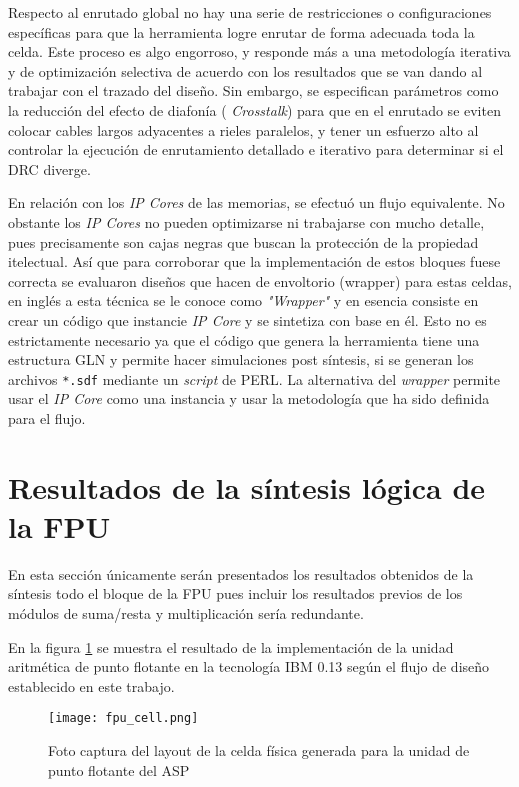 Respecto al enrutado global no hay una serie de restricciones o configuraciones específicas para que la herramienta logre enrutar de forma adecuada toda la celda. Este proceso es algo engorroso, y responde más a una metodología iterativa y de optimización selectiva de acuerdo con los resultados que se van dando al trabajar con el trazado del diseño. Sin embargo, se especifican parámetros como la reducción del efecto de diafonía ( \textit{Crosstalk}) para que en el enrutado se eviten colocar cables largos adyacentes a rieles paralelos, y tener un esfuerzo alto al controlar la ejecución de enrutamiento detallado e iterativo para determinar si el DRC diverge.

En relación con los \textit{IP Cores} de las memorias, se efectuó un flujo equivalente. No obstante los \textit{IP Cores} no pueden optimizarse ni trabajarse con mucho detalle, pues precisamente son cajas negras que buscan la protección de la propiedad itelectual. Así que para corroborar que la implementación de estos bloques fuese correcta se evaluaron diseños que hacen de envoltorio (wrapper) para estas celdas, en inglés a esta técnica se le conoce como \textit{"Wrapper"} y en esencia consiste en crear un código que instancie \textit{IP Core} y se sintetiza con base en él. Esto no es estrictamente necesario ya que el código que genera la herramienta tiene una estructura GLN y permite hacer simulaciones post síntesis, si se generan los archivos \texttt{*.sdf} mediante un \textit{script} de PERL. La alternativa del \textit{wrapper} permite usar el \textit{IP Core} como una instancia y usar la metodología que ha sido definida para el flujo.

\section{Resultados de la síntesis lógica de la FPU}
\label{sec:fpu_syn_result}
En esta sección únicamente serán presentados los resultados obtenidos de la síntesis todo el bloque de la FPU pues incluir los resultados previos de los módulos de suma/resta y multiplicación sería redundante.

En la figura \ref{fig:fpu_cell} se muestra el resultado de la implementación de la unidad aritmética de punto flotante en la tecnología IBM 0.13 según el flujo de diseño establecido en este trabajo.

\begin{figure}[h]
\texttt{[image: fpu\_cell.png]}
\centering
\caption{Foto captura del layout de la celda física generada para la unidad de punto flotante del ASP}
\label{fig:fpu_cell}
\end{figure}

